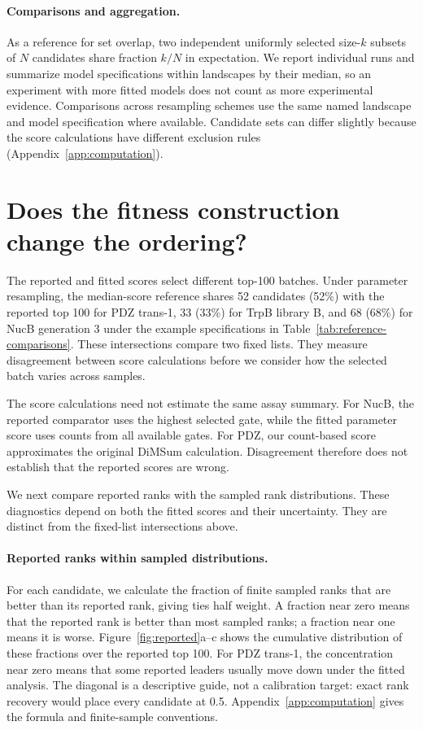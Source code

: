 \documentclass[11pt]{article}
\begin{document}
\paragraph{Comparisons and aggregation.}
As a reference for set overlap, two independent uniformly
selected size-$k$ subsets of $N$ candidates share fraction $k/N$ in expectation.
We report individual runs and summarize model specifications within landscapes
by their median, so an experiment with more fitted models does not count
as more experimental evidence. Comparisons across resampling schemes use
the same named landscape and model specification where available. Candidate
sets can differ slightly because the score calculations have different
exclusion rules (Appendix~\ref{app:computation}).

\section{Does the fitness construction change the ordering?}
\label{sec:reported}

The reported and fitted scores select different top-100 batches. Under
parameter resampling, the median-score reference shares 52 candidates
(52\%) with the reported top 100 for PDZ trans-1, 33 (33\%) for TrpB library
B, and 68 (68\%) for NucB generation 3 under the example specifications in
Table~\ref{tab:reference-comparisons}. These intersections compare two fixed
lists. They measure disagreement between score calculations before we
consider how the selected batch varies across samples.



The score calculations need not estimate the same assay summary. For NucB,
the reported comparator uses the highest selected gate, while the fitted
parameter score uses counts from all available gates. For PDZ, our
count-based score approximates the original DiMSum calculation. Disagreement
therefore does not establish that the reported scores are wrong.

We next compare reported ranks with the sampled rank distributions. These
diagnostics depend on both the fitted scores and their uncertainty. They
are distinct from the fixed-list intersections above.

\paragraph{Reported ranks within sampled distributions.}
For each candidate, we calculate the fraction of finite sampled ranks that
are better than its reported rank, giving ties half weight. A fraction
near zero means that the reported rank is better than most sampled ranks;
a fraction near one means it is worse. Figure~\ref{fig:reported}a--c shows
the cumulative distribution of these fractions over the reported top 100.
For PDZ trans-1, the concentration near zero means that some reported
leaders usually move down under the fitted analysis. The diagonal is a
descriptive guide, not a calibration target: exact rank recovery would
place every candidate at 0.5. Appendix~\ref{app:computation} gives the
formula and finite-sample conventions.
\end{document}
